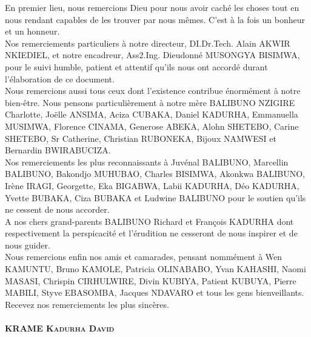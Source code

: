 En premier lieu, nous remercions Dieu pour nous avoir caché les choses tout en nous rendant capables de les trouver par nous mêmes. C'est à la fois un bonheur et un honneur.\\
Nos remerciements particuliers à notre directeur, DI.Dr.Tech. Alain AKWIR NKIEDIEL, et notre encadreur, Ass$ 2 $.Ing. Dieudonné MUSONGYA BISIMWA, pour le suivi humble, patient et attentif qu'ils nous ont accordé durant l'élaboration de ce document.\\
Nous remercions aussi tous ceux dont l'existence contribue énormément à notre bien-être. Nous pensons particulièrement à notre mère BALIBUNO NZIGIRE Charlotte, Joëlle ANSIMA, Aciza CUBAKA, Daniel KADURHA, Emmanuella MUSIMWA, Florence CINAMA, Generose ABEKA, Alohn SHETEBO, Carine SHETEBO, Sr Catherine, Christian RUBONEKA, Bijoux NAMWESI et Bernardin BWIRABUCIZA.\\
Nos remerciements les plus reconnaissants à Juvénal BALIBUNO, Marcellin BALIBUNO, Bakondjo MUHUBAO, Charles BISIMWA, Akonkwa BALIBUNO, Irène IRAGI, Georgette, Eka BIGABWA, Labii KADURHA, Déo KADURHA, Yvette BUBAKA, Ciza BUBAKA et Ludwine BALIBUNO pour le soutien qu'ils ne cessent de nous accorder.\\
A nos chers grand-parents BALIBUNO Richard et François KADURHA dont respectivement la perspicacité et l'érudition ne cesseront de nous inspirer et de nous guider.\\
Nous remercions enfin nos amis et camarades, pensant nommément à Wen KAMUNTU, Bruno KAMOLE, Patricia OLINABABO, Yvan KAHASHI, Naomi MASASI, Chrispin CIRHULWIRE, Divin KUBIYA, Patient KUBUYA, Pierre MABILI, Styve EBASOMBA, Jacques NDAVARO et tous les gens bienveillants. Recevez nos remerciements les plus sincères.
\paragraph{}
\begin{flushright}
\textbf{\textsc{KRAME Kadurha David}}
\end{flushright}
